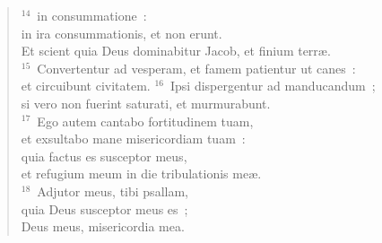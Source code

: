 \begin{flushleft}
\begin{verse}
${}^{14}$~in consummatione~:\\ in ira consummationis, et non erunt.\\ Et scient quia Deus dominabitur Jacob, et finium terr\ae .\\
${}^{15}$~Convertentur ad vesperam, et famem patientur ut canes~:\\ et circuibunt civitatem.
${}^{16}$~Ipsi dispergentur ad manducandum~;\\ si vero non fuerint saturati, et murmurabunt.\\
${}^{17}$~Ego autem cantabo fortitudinem tuam,\\ et exsultabo mane misericordiam tuam~:\\ quia factus es susceptor meus,\\ et refugium meum in die tribulationis me\ae .\\
${}^{18}$~Adjutor meus, tibi psallam,\\ quia Deus susceptor meus es~;\\ Deus meus, misericordia mea.\end{verse}\end{flushleft}


